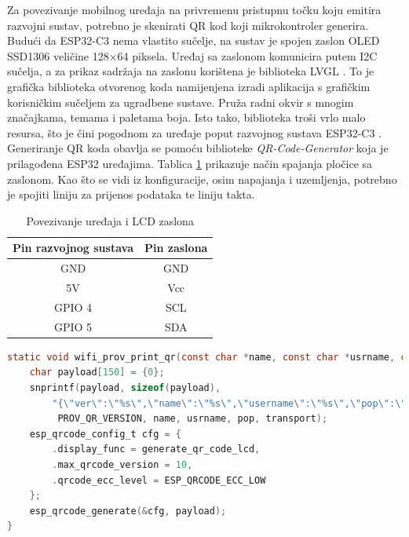 Za povezivanje mobilnog uređaja na privremenu pristupnu točku koju emitira razvojni sustav, potrebno je skenirati QR kod koji mikrokontroler generira. Budući da ESP32-C3 nema vlastito sučelje, na sustav je spojen zaslon OLED SSD1306 veličine 128×64 piksela. Uređaj sa zaslonom komunicira putem I2C sučelja, a za prikaz sadržaja na zaslonu korištena je biblioteka LVGL . To je grafička biblioteka otvorenog koda namijenjena izradi aplikacija s grafičkim korisničkim sučeljem  za ugradbene sustave. Pruža radni okvir s mnogim značajkama, temama i paletama boja. Isto tako, biblioteka troši vrlo malo resursa, što je čini pogodnom za uređaje poput razvojnog sustava ESP32-C3 \cite{lvgl}. Generiranje QR koda obavlja se pomoću biblioteke \textit{QR-Code-Generator} koja je prilagođena ESP32 uređajima. Tablica \ref{table:pinout_lcd} prikazuje način spajanja pločice sa zaslonom. Kao što se vidi iz konfiguracije, osim napajanja i uzemljenja, potrebno je spojiti liniju za prijenos podataka te liniju takta. 

\begin{table}[ht!]
	\centering
	\caption{Povezivanje uređaja i LCD zaslona}
	\begin{tabular}{|c| c|}
		\hline
		\rowcolor{lightblue}  
		\textbf{Pin razvojnog sustava} & \textbf{Pin zaslona} \\ \hline
		GND & GND \\ \hline
		5V & Vcc \\ \hline
		GPIO 4 & SCL  \\ \hline
		GPIO 5 & SDA \\ \hline
	\end{tabular}
	\label{table:pinout_lcd}
\end{table}

\begin{lstlisting}[caption={Generiranje QR koda iz pristupne točke}, language=c]
static void wifi_prov_print_qr(const char *name, const char *usrname, const char *pop, const char *transport, lv_disp_t *disp) {
	char payload[150] = {0};
    snprintf(payload, sizeof(payload), 	
    	"{\"ver\":\"%s\",\"name\":\"%s\",\"username\":\"%s\",\"pop\":\"%s\",\"transport\":\"%s\"}",
    	 PROV_QR_VERSION, name, usrname, pop, transport);
    esp_qrcode_config_t cfg = {
		.display_func = generate_qr_code_lcd, 
		.max_qrcode_version = 10, 
		.qrcode_ecc_level = ESP_QRCODE_ECC_LOW
	};
	esp_qrcode_generate(&cfg, payload);
}
\end{lstlisting}

